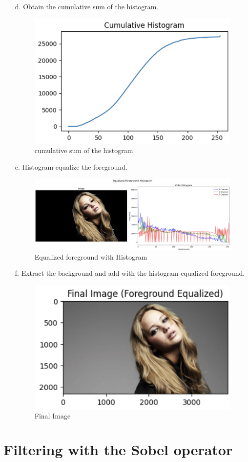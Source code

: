 \documentclass[12pt,a4paper]{article}
\begin{document}
\begin{enumerate}
    \item[d.] Obtain the cumulative sum of the histogram.
    \begin{figure}[H]
        \centering
        \includegraphics[width=0.3\linewidth]{images/Screenshots/6d.png}
        \caption{cumulative sum of the histogram}
        \label{fig:enter-label}
    \end{figure}

    \item[e.] Histogram-equalize the foreground.

    \begin{figure}[H]
        \centering
        \includegraphics[width=0.6\linewidth]{images/Screenshots/6e.png}
        \caption{Equalized foreground with Histogram}
        \label{fig:enter-label}
    \end{figure}

    \item[f.] Extract the background and add with the histogram equalized foreground.

    \begin{figure}[H]
        \centering
        \includegraphics[width=0.3\linewidth]{images/Screenshots/6f.png}
        \caption{Final Image}
        \label{fig:enter-label}
    \end{figure}

\end{enumerate}

\section{Filtering with the Sobel operator}
\end{document}
